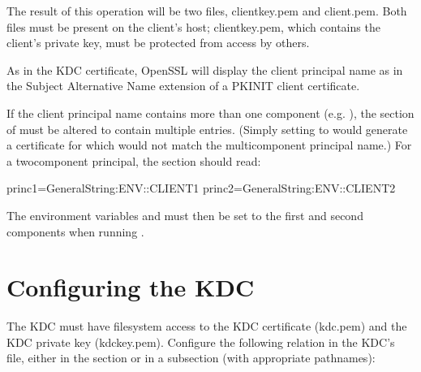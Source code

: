 \documentclass[letterpaper,10pt,english]{sphinxmanual}
\begin{document}
\sphinxAtStartPar
The result of this operation will be two files, clientkey.pem and
client.pem.  Both files must be present on the client’s host;
clientkey.pem, which contains the client’s private key, must be
protected from access by others.

\sphinxAtStartPar
As in the KDC certificate, OpenSSL will display the client principal
name as  in the Subject Alternative Name
extension of a PKINIT client certificate.

\sphinxAtStartPar
If the client principal name contains more than one component
(e.g. ), the \sphinxcode{\sphinxupquote{{[}principals{]}}} section of
 must be altered to contain multiple entries.
(Simply setting  to  would generate a
certificate for  which would not match the
multi\sphinxhyphen{}component principal name.)  For a two\sphinxhyphen{}component principal, the
section should read:

\begin{sphinxVerbatim}[commandchars=\\\{\}]
[principals]
princ1=GeneralString:\PYGZdl{}\PYGZob{}ENV::CLIENT1\PYGZcb{}
princ2=GeneralString:\PYGZdl{}\PYGZob{}ENV::CLIENT2\PYGZcb{}
\end{sphinxVerbatim}

\sphinxAtStartPar
The environment variables  and  must then be set
to the first and second components when running .


\section{Configuring the KDC}
\label{\detokenize{admin/pkinit:configuring-the-kdc}}
\sphinxAtStartPar
The KDC must have filesystem access to the KDC certificate (kdc.pem)
and the KDC private key (kdckey.pem).  Configure the following
relation in the KDC’s {\hyperref[\detokenize{admin/conf_files/kdc_conf:kdc-conf-5}]{}} file, either in the
{\hyperref[\detokenize{admin/conf_files/kdc_conf:kdcdefaults}]{}} section or in a {\hyperref[\detokenize{admin/conf_files/kdc_conf:kdc-realms}]{}} subsection (with
appropriate pathnames):
\end{document}
